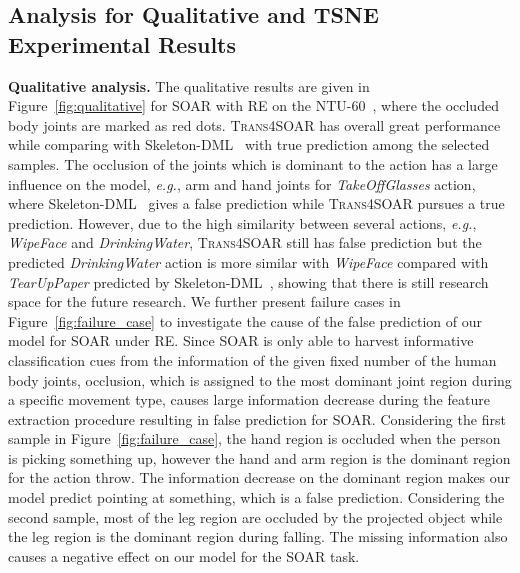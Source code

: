 \documentclass[lettersize,journal]{IEEEtran}
\begin{document}
\subsection{Analysis for Qualitative and TSNE Experimental Results}
\noindent\textbf{Qualitative analysis. }The qualitative results are given in Figure~\ref{fig:qualitative} for SOAR with RE on the NTU-60~\cite{shahroudy2016ntu}, where the occluded body joints are marked as red dots. \textsc{Trans4SOAR} has overall great performance while comparing with Skeleton-DML~\cite{memmesheimer2020skeleton_dml} with true prediction  among the selected  samples. The occlusion of the joints which is dominant to the action has a large influence on the model, \textit{e.g.}, arm and hand joints for \emph{TakeOffGlasses} action, where Skeleton-DML~\cite{memmesheimer2020skeleton_dml} gives a false prediction while \textsc{Trans4SOAR} pursues a true prediction. However, due to the high similarity between several actions, \textit{e.g.}, \emph{WipeFace} and \emph{DrinkingWater}, \textsc{Trans4SOAR} still has false prediction but the predicted \emph{DrinkingWater} action is more similar with \emph{WipeFace} compared with \emph{TearUpPaper} predicted by Skeleton-DML~\cite{memmesheimer2020skeleton_dml}, showing that there is still research space for the future research.
We further present failure cases in Figure~\ref{fig:failure_case} to investigate the cause of the false prediction of our model for SOAR under RE. Since SOAR is only able to harvest informative classification cues from the information of the given fixed number of the human body joints, occlusion, which is assigned to the most dominant joint region during a specific movement type, causes large information decrease during the feature extraction procedure resulting in false prediction for SOAR. Considering the first sample in Figure~\ref{fig:failure_case}, the hand region is occluded when the person is picking something up, however the hand and arm region is the dominant region for the action throw. The information decrease on the dominant region makes our model predict pointing at something, which is a false prediction. Considering the second sample, most of the leg region are occluded by the projected object while the leg region is the dominant region during falling. The missing information also causes a negative effect on our model for the SOAR task.
\end{document}
